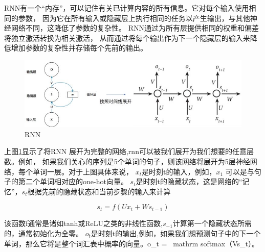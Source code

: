 RNN有一个“内存”，可以记住有关已计算内容的所有信息。它对每个输入使用相同的参数，
因为它在所有输入或隐藏层上执行相同的任务以产生输出，与其他神经网络不同，这降低了参数的复杂性。
RNN通过为所有层提供相同的权重和偏差将独立激活转换为相关激活，
从而通过将每个输出作为下一个隐藏层的输入来降低增加参数的复杂性并存储每个先前的输出。

\begin{figure}[htbp]
  \centering
  \includegraphics[scale=0.5]{./images/rnn.jpg}
  \caption{RNN}
  \label{fig:rnn}
\end{figure}

上图\ref{fig:rnn}显示了将RNN 展开为完整的网络,rnn可以被我们展开为我们想要的任意层数。例如，
如果我们关心的序列是5个单词的句子，则该网络将展开为5层神经网络，每个单词一层。对于上图具体来说，
$x_{t}$是时刻t的输入，例如，$x_{1}$ 可以是与句子的第二个单词相对应的one-hot向量。
$s_{t}$是时刻t的隐藏状态，这是网络的“记忆”，$s_{t}$根据先前的隐藏状态和当前步骤的输入来计算

\begin{equation}
  s_{t}=f\left(U x_{t}+W s_{t-1}\right)
  \end{equation}

该函数f通常是诸如tanh或ReLU之类的非线性函数,$s_{-1}$计算第一个隐藏状态所需的，通常初始化为全零。
$o_{t}$是时刻t的输出,例如，如果我们想预测句子中的下一个单词，那么它将是整个词汇表中概率的向量。o_t = \ mathrm {softmax}（Vs_t）。
